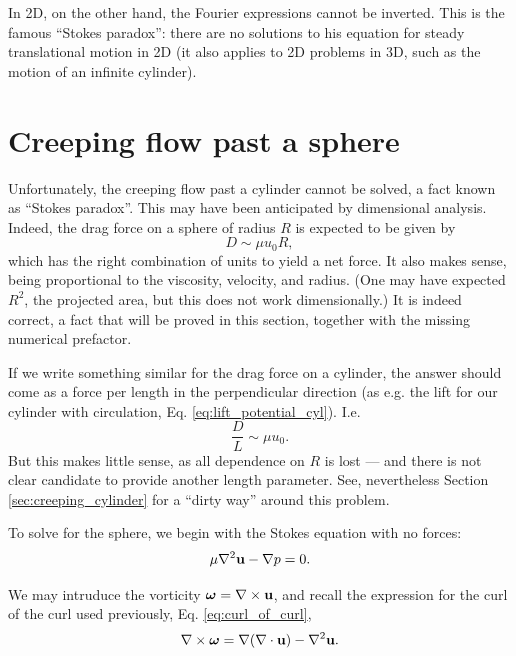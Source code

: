 In 2D, on the other hand, the Fourier expressions cannot be
inverted. This is the famous ``Stokes paradox'': there are no solutions to his equation for steady
translational motion in 2D (it also applies to 2D problems in 3D, such
as the motion of an infinite cylinder).




\section{Creeping flow past a sphere}

Unfortunately, the creeping flow past a cylinder cannot be solved, a fact known
as ``Stokes paradox''. This may have been anticipated by dimensional
analysis. Indeed, the drag force on a sphere of radius $R$ is expected
to be given by
\begin{equation}
  \label{eq:drag_sphere_guess}
  D \sim \mu u_0 R ,
\end{equation}
%
which has the right combination of units to yield a net force. It also
makes sense, being proportional to the viscosity, velocity, and
radius. (One may have expected $R^2$, the projected area, but this
does not work dimensionally.) It is indeed correct, a fact that will
be proved in this section, together with the missing numerical
prefactor.

If we write something similar for the drag force on a cylinder, the
answer should come as a force per length in the perpendicular
direction (as e.g. the lift for our cylinder with circulation,
Eq. \ref{eq:lift_potential_cyl}). I.e.
\begin{equation}
  \label{eq:drag_cyl_guess}
  \frac{D}{L} \sim \mu u_0 .
\end{equation}
%
But this makes little sense, as all dependence on $R$ is lost ---
and there is not clear candidate to provide another length parameter.
See, nevertheless Section \ref{sec:creeping_cylinder} for a ``dirty
way'' around this problem.

To solve for the sphere, we begin with the Stokes equation with no
forces:
\begin{equation}
  \label{eq:Stokes_no_f}
  \mu \nabla^2 \mathbf{u} -\nabla p = 0 .
\end{equation}

We may intruduce the vorticity $\bm{\omega}=\nabla\times\mathbf{u}$, and recall
the expression for the curl of the curl used previously,
Eq. \ref{eq:curl_of_curl},
%
\begin{equation*}
  \nabla \times \bm{\omega} =
  \nabla (\nabla \cdot \mathbf{u} )-\nabla^{2} \mathbf{u} .
\end{equation*}

